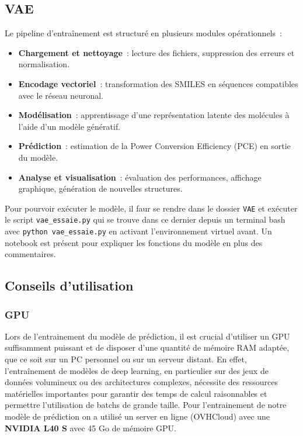 \subsection{VAE}
Le pipeline d'entraînement est structuré en plusieurs modules opérationnels :

\begin{itemize}
    \item \textbf{Chargement et nettoyage} : lecture des fichiers, suppression des erreurs et normalisation.
    \item \textbf{Encodage vectoriel} : transformation des SMILES en séquences compatibles avec le réseau neuronal.
    \item \textbf{Modélisation} : apprentissage d'une représentation latente des molécules à l'aide d'un modèle génératif.
    \item \textbf{Prédiction} : estimation de la Power Conversion Efficiency (PCE) en sortie du modèle.
    \item \textbf{Analyse et visualisation} : évaluation des performances, affichage graphique, génération de nouvelles structures.
\end{itemize}

Pour pourvoir exécuter le modèle, il faur se rendre dans le dossier \texttt{VAE} et exécuter le script \texttt{vae\_essaie.py} qui se trouve dans ce dernier depuis un terminal bash avec \texttt{python vae\_essaie.py} en activant l'environnement virtuel avant.
Un notebook est présent pour expliquer les fonctions du modèle en plus des commentaires.



\subsection{Conseils d'utilisation}

\subsubsection{GPU}
Lors de l'entrainement du modèle de prédiction, il est crucial d'utiliser un GPU suffisamment puissant et de disposer d'une quantité de mémoire RAM adaptée, que ce soit sur un PC personnel ou sur un serveur distant. En effet, l'entraînement de modèles de deep learning, en particulier sur des jeux de données volumineux ou des architectures complexes, nécessite des ressources matérielles importantes pour garantir des temps de calcul raisonnables et permettre l'utilisation de batchs de grande taille.
Pour l'entrainement de notre modèle de prédiction on a utilisé un server en ligne (OVHCloud) avec une \textbf{NVIDIA L40 S} avec 45 Go de mémoire GPU. 


